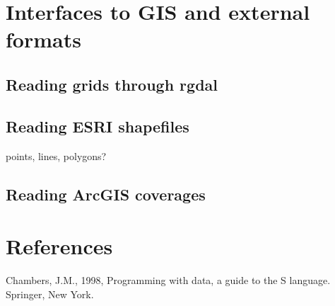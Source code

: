 \documentclass{article}
\begin{document}
\section{Interfaces to GIS and external formats}

\subsection{Reading grids through rgdal}
%

\subsection{Reading ESRI shapefiles}
points, lines, polygons?
\subsection{Reading ArcGIS coverages}

\section*{References}
\begin{description}
\item Chambers, J.M., 1998, Programming with data, a guide to the S language.
Springer, New York.
\end{description}
\end{document}
